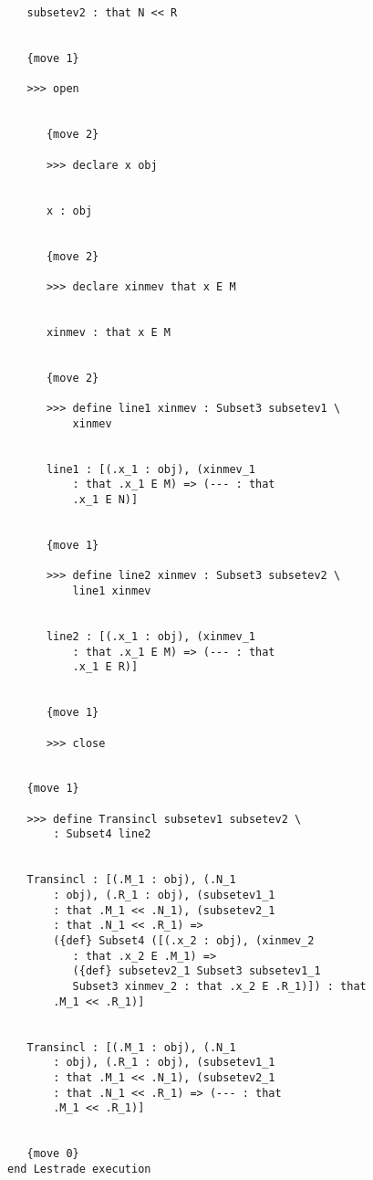 \documentclass[12pt]{article}
\begin{document}
\begin{enumerate}
\begin{verbatim}
   subsetev2 : that N << R


   {move 1}

   >>> open


      {move 2}

      >>> declare x obj


      x : obj


      {move 2}

      >>> declare xinmev that x E M


      xinmev : that x E M


      {move 2}

      >>> define line1 xinmev : Subset3 subsetev1 \
          xinmev


      line1 : [(.x_1 : obj), (xinmev_1 
          : that .x_1 E M) => (--- : that 
          .x_1 E N)]


      {move 1}

      >>> define line2 xinmev : Subset3 subsetev2 \
          line1 xinmev


      line2 : [(.x_1 : obj), (xinmev_1 
          : that .x_1 E M) => (--- : that 
          .x_1 E R)]


      {move 1}

      >>> close


   {move 1}

   >>> define Transincl subsetev1 subsetev2 \
       : Subset4 line2


   Transincl : [(.M_1 : obj), (.N_1 
       : obj), (.R_1 : obj), (subsetev1_1 
       : that .M_1 << .N_1), (subsetev2_1 
       : that .N_1 << .R_1) => 
       ({def} Subset4 ([(.x_2 : obj), (xinmev_2 
          : that .x_2 E .M_1) => 
          ({def} subsetev2_1 Subset3 subsetev1_1 
          Subset3 xinmev_2 : that .x_2 E .R_1)]) : that 
       .M_1 << .R_1)]


   Transincl : [(.M_1 : obj), (.N_1 
       : obj), (.R_1 : obj), (subsetev1_1 
       : that .M_1 << .N_1), (subsetev2_1 
       : that .N_1 << .R_1) => (--- : that 
       .M_1 << .R_1)]


   {move 0}
end Lestrade execution


\end{verbatim}


\end{enumerate}
\end{document}
